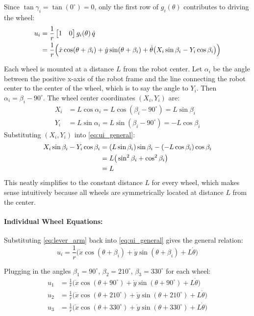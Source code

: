 \begin{enumerate}[label=\textbf{(\alph*)}]
    Since $\tan\gamma_i = \tan(0^\circ) = 0$, only the first row of $g_i(\theta)$ contributes to driving the wheel:
    \begin{align}
        u_i &= \frac{1}{r} \begin{bmatrix} 1 & 0 \end{bmatrix} g_i(\theta)\,\dot{q} \notag \\
        &= \frac{1}{r} \Big( \dot{x}\cos(\theta + \beta_i) + \dot{y}\sin(\theta + \beta_i) + \dot{\theta}\big(X_i\sin\beta_i - Y_i\cos\beta_i\big) \Big) \label{eq:ui_general}
    \end{align}

    Each wheel is mounted at a distance $L$ from the robot center. Let $\alpha_i$ be the angle between the positive x-axis of the robot frame and the line connecting the robot center to the center of the wheel, which is to say the angle to $Y_i$. Then $\alpha_i = \beta_i - 90^\circ$. The wheel center coordinates $(X_i, Y_i)$ are:
    \begin{align*}
        X_i &= L\cos\alpha_i = L\cos(\beta_i - 90^\circ) = L\sin\beta_i \\
        Y_i &= L\sin\alpha_i = L\sin(\beta_i - 90^\circ) = -L\cos\beta_i
    \end{align*}
    Substituting $(X_i, Y_i)$ into \eqref{eq:ui_general}:
    \begin{align}
        X_i \sin\beta_i - Y_i \cos\beta_i &= (L\sin\beta_i)\sin\beta_i - (-L\cos\beta_i)\cos\beta_i \notag \\
        &= L\big(\sin^2\beta_i + \cos^2\beta_i\big) \notag \\
        &= L \label{eq:lever_arm}
    \end{align}
    This neatly simplifies to the constant distance $L$ for every wheel, which makes sense intuitively because all wheels are symmetrically located at distance $L$ from the center.

    \paragraph{Individual Wheel Equations:}
    Substituting \eqref{eq:lever_arm} back into \eqref{eq:ui_general} gives the general relation:
    \begin{equation}
        u_i = \frac{1}{r} \Big( \dot{x}\cos(\theta + \beta_i) + \dot{y}\sin(\theta + \beta_i) + L\dot{\theta} \Big)
    \end{equation}

    Plugging in the angles $\beta_1 = 90^\circ$, $\beta_2 = 210^\circ$, $\beta_3 = 330^\circ$ for each wheel:
    \begin{align}
        u_1 &= \frac{1}{r}\Big( \dot{x}\cos(\theta + 90^\circ) + \dot{y}\sin(\theta + 90^\circ) + L\dot{\theta} \Big) \\
        u_2 &= \frac{1}{r}\Big( \dot{x}\cos(\theta + 210^\circ) + \dot{y}\sin(\theta + 210^\circ) + L\dot{\theta} \Big) \\
        u_3 &= \frac{1}{r}\Big( \dot{x}\cos(\theta + 330^\circ) + \dot{y}\sin(\theta + 330^\circ) + L\dot{\theta} \Big)
    \end{align}


\end{enumerate}
